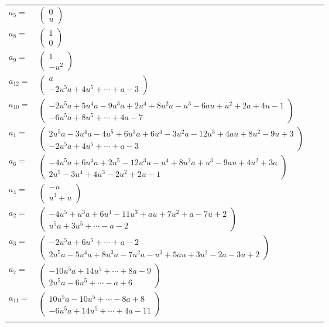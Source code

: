 \documentclass[1p]{elsarticle_modified}
\theoremstyle{definition}
\begin{document}
\begin{tabular}{m{7pt} m{180pt} m{7pt} m{180pt} }
\flushright $a_{5}=$&$\begin{pmatrix}0\\u\end{pmatrix}$ \\
\flushright $a_{8}=$&$\begin{pmatrix}1\\0\end{pmatrix}$ \\
\flushright $a_{9}=$&$\begin{pmatrix}1\\- u^2\end{pmatrix}$ \\
\flushright $a_{12}=$&$\begin{pmatrix}a\\-2 u^5 a+4 u^5+\cdots+a-3\end{pmatrix}$ \\
\flushright $a_{10}=$&$\begin{pmatrix}-2 u^5 a+5 u^4 a-9 u^3 a+2 u^4+8 u^2 a- u^3-6 a u+u^2+2 a+4 u-1\\-6 u^5 a+8 u^5+\cdots+4 a-7\end{pmatrix}$ \\
\flushright $a_{1}=$&$\begin{pmatrix}2 u^5 a-3 u^4 a-4 u^5+6 u^3 a+6 u^4-3 u^2 a-12 u^3+4 a u+8 u^2-9 u+3\\-2 u^5 a+4 u^5+\cdots+a-3\end{pmatrix}$ \\
\flushright $a_{6}=$&$\begin{pmatrix}-4 u^5 a+6 u^4 a+2 u^5-12 u^3 a- u^4+8 u^2 a+u^3-9 a u+4 u^2+3 a\\2 u^5-3 u^4+4 u^3-2 u^2+2 u-1\end{pmatrix}$ \\
\flushright $a_{4}=$&$\begin{pmatrix}- u\\u^3+u\end{pmatrix}$ \\
\flushright $a_{2}=$&$\begin{pmatrix}-4 u^5+u^3 a+6 u^4-11 u^3+a u+7 u^2+a-7 u+2\\u^5 a+3 u^5+\cdots- a-2\end{pmatrix}$ \\
\flushright $a_{3}=$&$\begin{pmatrix}-2 u^5 a+6 u^5+\cdots+a-2\\2 u^5 a-5 u^4 a+8 u^3 a-7 u^2 a- u^3+5 a u+3 u^2-2 a-3 u+2\end{pmatrix}$ \\
\flushright $a_{7}=$&$\begin{pmatrix}-10 u^5 a+14 u^5+\cdots+8 a-9\\2 u^5 a-6 u^5+\cdots- a+6\end{pmatrix}$ \\
\flushright $a_{11}=$&$\begin{pmatrix}10 u^5 a-10 u^5+\cdots-8 a+8\\-6 u^5 a+14 u^5+\cdots+4 a-11\end{pmatrix}$\\&\end{tabular}
\end{document}
